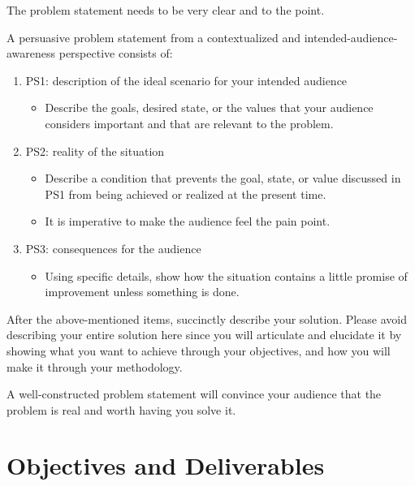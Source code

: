 The problem statement needs to be very clear and to the point. 

\noindent A persuasive problem statement from a contextualized and intended-audience-awareness perspective consists of:

\begin{enumerate}
	\item PS1: description of the ideal scenario for your intended audience	
	\begin{itemize}
		\item Describe the goals, desired state, or the values that your audience considers important and that are relevant to the problem.
	\end{itemize}
	
	\item PS2:  reality of the situation
	\begin{itemize}
			\item Describe a condition that prevents the goal, state, or value discussed in PS1 from being achieved or realized at the present time.
			\item It is imperative to make the audience feel the pain point.
	\end{itemize}
	
	\item PS3:  consequences for the audience		
	\begin{itemize}
			\item Using specific details, show how the situation contains a little promise of improvement unless something is done.
	\end{itemize}

\end{enumerate}

\noindent After the above-mentioned items, succinctly describe your solution.  Please avoid describing your entire solution here since you will articulate and elucidate it by showing what you want to achieve through your objectives, and how you will make it through your methodology.

\noindent A well-constructed problem statement will convince your audience that the problem is real and worth having you solve it.



\graytx{\blindtext}



\section{Objectives and Deliverables}


